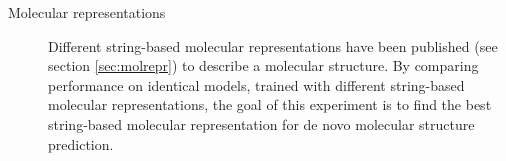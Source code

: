 \begin{description}
    \item[Molecular representations]
    Different string-based molecular representations have been published (see section \ref{sec:molrepr}) to describe a molecular structure.
    By comparing performance on identical models, trained with different string-based molecular representations,
    the goal of this experiment is to find the best string-based molecular representation for de novo molecular structure prediction.
     
\end{description}

